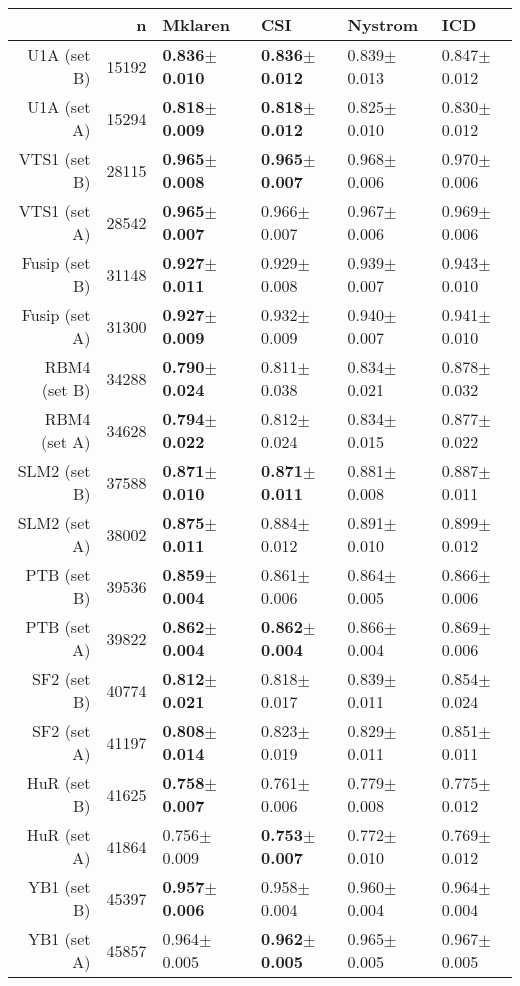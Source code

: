 \begin{table}[ht]
\centering
\begin{tabular}{rr|llll}
  \hline
 & n & Mklaren & CSI & Nystrom & ICD \\ 
  \hline
U1A (set B) & 15192 & \textbf{0.836$\pm$0.010} & \textbf{0.836$\pm$0.012} & 0.839$\pm$0.013 & 0.847$\pm$0.012 \\ 
  U1A (set A) & 15294 & \textbf{0.818$\pm$0.009} & \textbf{0.818$\pm$0.012} & 0.825$\pm$0.010 & 0.830$\pm$0.012 \\ 
  VTS1 (set B) & 28115 & \textbf{0.965$\pm$0.008} & \textbf{0.965$\pm$0.007} & 0.968$\pm$0.006 & 0.970$\pm$0.006 \\ 
  VTS1 (set A) & 28542 & \textbf{0.965$\pm$0.007} & 0.966$\pm$0.007 & 0.967$\pm$0.006 & 0.969$\pm$0.006 \\ 
  Fusip (set B) & 31148 & \textbf{0.927$\pm$0.011} & 0.929$\pm$0.008 & 0.939$\pm$0.007 & 0.943$\pm$0.010 \\ 
  Fusip (set A) & 31300 & \textbf{0.927$\pm$0.009} & 0.932$\pm$0.009 & 0.940$\pm$0.007 & 0.941$\pm$0.010 \\ 
  RBM4 (set B) & 34288 & \textbf{0.790$\pm$0.024} & 0.811$\pm$0.038 & 0.834$\pm$0.021 & 0.878$\pm$0.032 \\ 
  RBM4 (set A) & 34628 & \textbf{0.794$\pm$0.022} & 0.812$\pm$0.024 & 0.834$\pm$0.015 & 0.877$\pm$0.022 \\ 
  SLM2 (set B) & 37588 & \textbf{0.871$\pm$0.010} & \textbf{0.871$\pm$0.011} & 0.881$\pm$0.008 & 0.887$\pm$0.011 \\ 
  SLM2 (set A) & 38002 & \textbf{0.875$\pm$0.011} & 0.884$\pm$0.012 & 0.891$\pm$0.010 & 0.899$\pm$0.012 \\ 
  PTB (set B) & 39536 & \textbf{0.859$\pm$0.004} & 0.861$\pm$0.006 & 0.864$\pm$0.005 & 0.866$\pm$0.006 \\ 
  PTB (set A) & 39822 & \textbf{0.862$\pm$0.004} & \textbf{0.862$\pm$0.004} & 0.866$\pm$0.004 & 0.869$\pm$0.006 \\ 
  SF2 (set B) & 40774 & \textbf{0.812$\pm$0.021} & 0.818$\pm$0.017 & 0.839$\pm$0.011 & 0.854$\pm$0.024 \\ 
  SF2 (set A) & 41197 & \textbf{0.808$\pm$0.014} & 0.823$\pm$0.019 & 0.829$\pm$0.011 & 0.851$\pm$0.011 \\ 
  HuR (set B) & 41625 & \textbf{0.758$\pm$0.007} & 0.761$\pm$0.006 & 0.779$\pm$0.008 & 0.775$\pm$0.012 \\ 
  HuR (set A) & 41864 & 0.756$\pm$0.009 & \textbf{0.753$\pm$0.007} & 0.772$\pm$0.010 & 0.769$\pm$0.012 \\ 
  YB1 (set B) & 45397 & \textbf{0.957$\pm$0.006} & 0.958$\pm$0.004 & 0.960$\pm$0.004 & 0.964$\pm$0.004 \\ 
  YB1 (set A) & 45857 & 0.964$\pm$0.005 & \textbf{0.962$\pm$0.005} & 0.965$\pm$0.005 & 0.967$\pm$0.005 \\ 
   \hline
\end{tabular}
\end{table}
